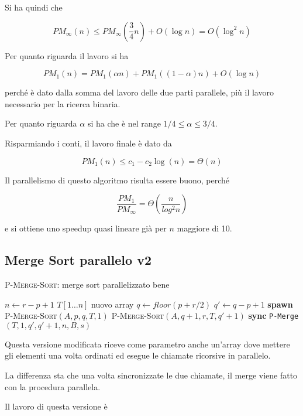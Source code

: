 Si ha quindi che

$$
PM_\infty(n) \leq PM_\infty(\frac{3}{4}n) + O(\log n) = O(\log^2 n)
$$

Per quanto riguarda il lavoro si ha

$$
PM_1(n) = PM_1(\alpha n) + PM_1( (1-\alpha) n) + O(\log n)
$$

perché è dato dalla somma del lavoro delle due parti parallele, più il lavoro necessario per la ricerca binaria.

Per quanto riguarda $\alpha$ si ha che è nel range $1/4 \leq \alpha \leq 3/4$.

Risparmiando i conti, il lavoro finale è dato da

$$
PM_1(n) \leq c_1 - c_2 \log (n) = \Theta (n)
$$

Il parallelismo di questo algoritmo risulta essere buono, perché

$$
\frac{PM_1}{PM_\infty} = \Theta (\frac{n}{log^2 n})
$$

e si ottiene uno speedup quasi lineare già per $n$ maggiore di 10.

\subsection{Merge Sort parallelo v2}\label{merge-sort-parallelo-v2}

\begin{breakablealgorithm}
	\caption{\textsc{P-Merge-Sort}: merge sort parallelizzato bene}
	\begin{algorithmic}[1]
\State $n \gets r - p +1$
    \State \Return
\EndIf 
{}
    \State $T[1 \ldots n] $ nuovo array
    \State $q \gets floor(p+r/2)$
    \State $q' \gets q - p +1$
    \State \textbf{spawn } \textsc{P-Merge-Sort}$(A,p,q, T, 1)$
    \State \textsc{P-Merge-Sort}$(A,q+1,r, T, q'+1)$
    \State \textbf{sync}
    \State \texttt{P-Merge}$(T, 1, q', q'+1, n, B, s)$
\EndIf
\EndFunction
\end{algorithmic}
\end{breakablealgorithm}

Questa versione modificata riceve come parametro anche un'array dove mettere gli elementi una volta ordinati ed esegue le chiamate ricorsive in parallelo.

La differenza sta che una volta sincronizzate le due chiamate, il merge viene fatto con la procedura parallela.

Il lavoro di questa versione è

